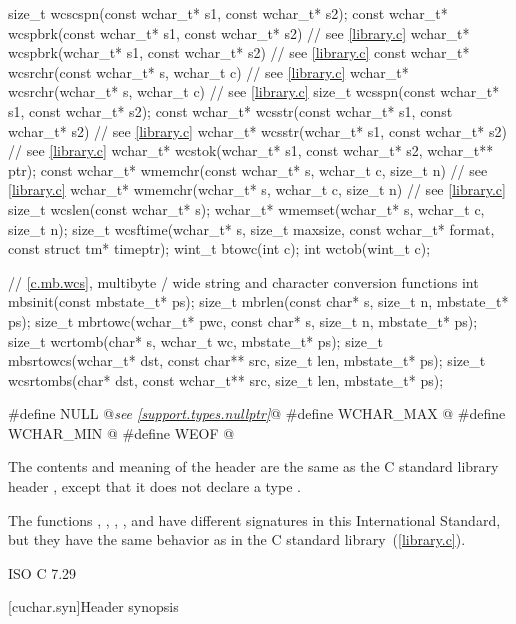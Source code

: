 \begin{codeblock}
{  size_t wcscspn(const wchar_t* s1, const wchar_t* s2);
  const wchar_t* wcspbrk(const wchar_t* s1, const wchar_t* s2)  // see \ref{library.c}
  wchar_t* wcspbrk(wchar_t* s1, const wchar_t* s2)  // see \ref{library.c}
  const wchar_t* wcsrchr(const wchar_t* s, wchar_t c)  // see \ref{library.c}
  wchar_t* wcsrchr(wchar_t* s, wchar_t c)  // see \ref{library.c}
  size_t wcsspn(const wchar_t* s1, const wchar_t* s2);
  const wchar_t* wcsstr(const wchar_t* s1, const wchar_t* s2)  // see \ref{library.c}
  wchar_t* wcsstr(wchar_t* s1, const wchar_t* s2)  // see \ref{library.c}
  wchar_t* wcstok(wchar_t* s1, const wchar_t* s2, wchar_t** ptr);
  const wchar_t* wmemchr(const wchar_t* s, wchar_t c, size_t n)  // see \ref{library.c}
  wchar_t* wmemchr(wchar_t* s, wchar_t c, size_t n)  // see \ref{library.c}
  size_t wcslen(const wchar_t* s);
  wchar_t* wmemset(wchar_t* s, wchar_t c, size_t n);
  size_t wcsftime(wchar_t* s, size_t maxsize, const wchar_t* format, const struct tm* timeptr);
  wint_t btowc(int c);
  int wctob(wint_t c);

  // \ref{c.mb.wcs}, multibyte / wide string and character conversion functions
  int mbsinit(const mbstate_t* ps);
  size_t mbrlen(const char* s, size_t n, mbstate_t* ps);
  size_t mbrtowc(wchar_t* pwc, const char* s, size_t n, mbstate_t* ps);
  size_t wcrtomb(char* s, wchar_t wc, mbstate_t* ps);
  size_t mbsrtowcs(wchar_t* dst, const char** src, size_t len, mbstate_t* ps);
  size_t wcsrtombs(char* dst, const wchar_t** src, size_t len, mbstate_t* ps);
}

#define NULL @\textit{see \ref{support.types.nullptr}}@
#define WCHAR_MAX @\seebelow@
#define WCHAR_MIN @\seebelow@
#define WEOF @\seebelow@
\end{codeblock}

\pnum
{}%
%
The contents and meaning of the header 
are the same as the C standard library header
, except that it does not declare a type .

\pnum
\begin{note}
The functions
, , , , and 
have different signatures in this International Standard,
but they have the same behavior as in the C standard library~(\ref{library.c}).
\end{note}

\xref ISO C 7.29

[cuchar.syn]{Header  synopsis}

